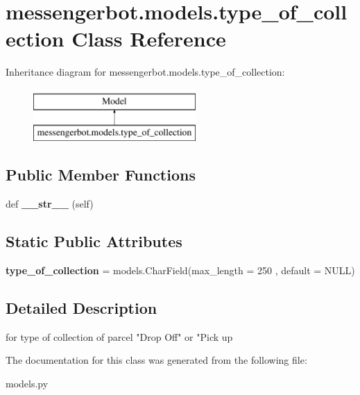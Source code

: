 \hypertarget{classmessengerbot_1_1models_1_1type__of__collection}{}\section{messengerbot.\+models.\+type\+\_\+of\+\_\+collection Class Reference}
\label{classmessengerbot_1_1models_1_1type__of__collection}
Inheritance diagram for messengerbot.\+models.\+type\+\_\+of\+\_\+collection\+:\begin{figure}[H]
\begin{center}
\leavevmode
\includegraphics[height=2.000000cm]{classmessengerbot_1_1models_1_1type__of__collection}
\end{center}
\end{figure}
\subsection*{Public Member Functions}
\begin{DoxyCompactItemize}
\item 
\mbox{\label{classmessengerbot_1_1models_1_1type__of__collection_a1b6a6ac597b4c84bfd6a96bfaedfc708}} 
def {\bfseries \+\_\+\+\_\+str\+\_\+\+\_\+} (self)
\end{DoxyCompactItemize}
\subsection*{Static Public Attributes}
\begin{DoxyCompactItemize}
\item 
\mbox{\label{classmessengerbot_1_1models_1_1type__of__collection_a2d65815b76f23bad35232b6c926aed23}} 
{\bfseries type\+\_\+of\+\_\+collection} = models.\+Char\+Field(max\+\_\+length = 250 , default = \textquotesingle{}N\+U\+LL\textquotesingle{})
\end{DoxyCompactItemize}


\subsection{Detailed Description}
\begin{DoxyVerb}for type of collection of parcel "Drop Off" or "Pick up\end{DoxyVerb}
 

The documentation for this class was generated from the following file\+:\begin{DoxyCompactItemize}
\item 
models.\+py\end{DoxyCompactItemize}
